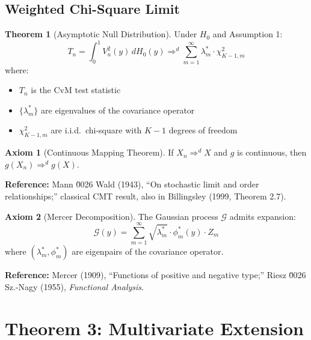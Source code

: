 \documentclass[11pt,a4paper]{amsart}
\theoremstyle{definition}
\newtheorem{theorem}{Theorem}[section]
\newtheorem{axiom}{Axiom}[section]
\newcommand{\aslim}{\Rightarrow^d}
\begin{document}
\subsection{Weighted Chi-Square Limit}

\begin{theorem}[Asymptotic Null Distribution]
\label{thm:weighted-chi2}
Under $H_0$ and Assumption 1:
\begin{equation*}
T_n = \int_0^1 V_n^2(y)\, dH_0(y) \aslim \sum_{m=1}^\infty \lambda_m^* \cdot \chi^2_{K-1,m}
\end{equation*}
where:
\begin{itemize}
\item $T_n$ is the CvM test statistic
\item $\{\lambda_m^*\}$ are eigenvalues of the covariance operator
\item $\chi^2_{K-1,m}$ are i.i.d.~chi-square with $K-1$ degrees of freedom
\end{itemize}
\end{theorem}

\begin{axiom}[Continuous Mapping Theorem]
\label{ax:cmt}
If $X_n \aslim X$ and $g$ is continuous, then $g(X_n) \aslim g(X)$.

\textbf{Reference:} Mann \u0026 Wald (1943), ``On stochastic limit and order relationships;''
classical CMT result, also in Billingsley (1999, Theorem 2.7).
\end{axiom}

\begin{axiom}[Mercer Decomposition]
\label{ax:mercer}
The Gaussian process $\mathcal{G}$ admits expansion:
\begin{equation*}
\mathcal{G}(y) = \sum_{m=1}^\infty \sqrt{\lambda_m^*} \cdot \phi^*_m(y) \cdot Z_m
\end{equation*}
where $(\lambda_m^*, \phi_m^*)$ are eigenpairs of the covariance operator.

\textbf{Reference:} Mercer (1909), ``Functions of positive and negative type;''
Riesz \u0026 Sz.-Nagy (1955), \textit{Functional Analysis}.
\end{axiom}

\section{Theorem 3: Multivariate Extension}
\label{sec:theorem3}
\end{document}
